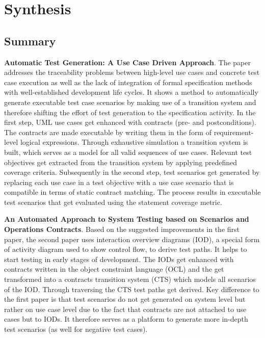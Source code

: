 \section{Synthesis}
\label{section:synthesis}

\subsection{Summary}

\textbf{Automatic Test Generation: A Use Case Driven Approach}. The paper addresses the traceability problems between high-level use cases and concrete test case execution as well as the lack of integration of formal specification methods with well-established development life cycles. It shows a method to automatically generate executable test case scenarios by making use of a transition system and therefore shifting the effort of test generation to the specification activity. In the first step, UML use cases get enhanced with contracts (pre- and postconditions). The contracts are made executable by writing them in the form of requirement-level logical expressions. Through exhaustive simulation a transition system is built, which serves as a model for all valid sequences of use cases. Relevant test objectives get extracted from the transition system by applying predefined coverage criteria. Subsequently in the second step, test scenarios get generated by replacing each use case in a test objective with a use case scenario that is compatible in terms of static contract matching. The process results in executable test scenarios that get evaluated using the statement coverage metric. \newline


\textbf{An Automated Approach to System Testing based on Scenarios and Operations Contracts}. Based on the suggested improvements in the first paper, the second paper uses interaction overview diagrams (IOD), a special form of activity diagram used to show control flow, to derive test paths. It helps to start testing in early stages of development. The IODs get enhanced with contracts written in the object constraint language (OCL) and the get transformed into a contracts transition system (CTS) which models all scenarios of the IOD. Through traversing the CTS test paths get derived. Key difference to the first paper is that test scenarios do not get generated on system level but rather on use case level due to the fact that contracts are not attached to use cases but to IODs. It therefore serves as a platform to generate more in-depth test scenarios (as well for negative test cases). 

